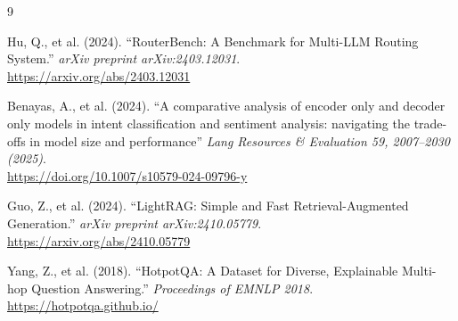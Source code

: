 \documentclass[11pt, a4paper]{article}
\begin{document}
\begin{thebibliography}{9}

Hu, Q., et al. (2024). 
``RouterBench: A Benchmark for Multi-LLM Routing System.'' 
\textit{arXiv preprint arXiv:2403.12031}. \\
\url{https://arxiv.org/abs/2403.12031}

Benayas, A., et al. (2024). 
``A comparative analysis of encoder only and decoder only models in intent classification and sentiment analysis: navigating the trade-offs in model size and performance'' 
\textit{Lang Resources \& Evaluation 59, 2007–2030 (2025)}. \\
\url{ https://doi.org/10.1007/s10579-024-09796-y}

Guo, Z., et al. (2024). 
``LightRAG: Simple and Fast Retrieval-Augmented Generation.'' 
\textit{arXiv preprint arXiv:2410.05779}. \\
\url{https://arxiv.org/abs/2410.05779}

Yang, Z., et al. (2018). 
``HotpotQA: A Dataset for Diverse, Explainable Multi-hop Question Answering.'' 
\textit{Proceedings of EMNLP 2018}. \\
\url{https://hotpotqa.github.io/}

\end{thebibliography}
\end{document}
